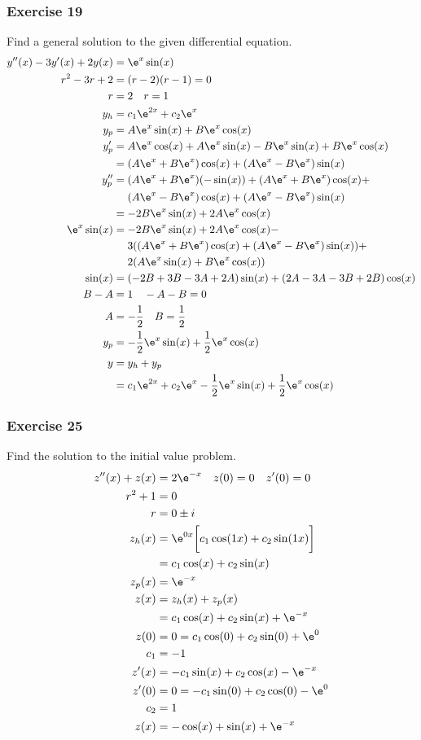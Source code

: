 \documentclass{math}
\begin{document}
\subsubsection*{Exercise 19}
Find a general solution to the given differential equation.
\begin{align*}
  y''(x)-3y'(x)+2y(x) &= \e^x\sin(x) \\
  r^2-3r+2 &= (r-2)(r-1) = 0 \\
  r &= 2 \quad r = 1 \\
  y_h &= c_1\e^{2x}+c_2\e^{x} \\
  y_p &= A\e^x\sin(x)+B\e^x\cos(x) \\
  y_p' &= A\e^x\cos(x)+A\e^x\sin(x)-B\e^x\sin(x)+B\e^x\cos(x) \\
  &= (A\e^x+B\e^x)\cos(x)+(A\e^x-B\e^x)\sin(x) \\
  y_p'' &= (A\e^x+B\e^x)(-\sin(x))+(A\e^x+B\e^x)\cos(x)+ \\
    &\quad~ (A\e^x-B\e^x)\cos(x)+(A\e^x-B\e^x)\sin(x) \\
  &= -2B\e^x\sin(x)+2A\e^x\cos(x) \\
  \e^x\sin(x) &= -2B\e^x\sin(x)+2A\e^x\cos(x)- \\
    &\quad~ 3((A\e^x+B\e^x)\cos(x)+(A\e^x-B\e^x)\sin(x))+ \\
    &\quad~ 2(A\e^x\sin(x)+B\e^x\cos(x)) \\
  \sin(x) &= (-2B+3B-3A+2A)\sin(x)+(2A-3A-3B+2B)\cos(x) \\
  B-A &= 1 \quad -A-B = 0 \\
  A &= -\frac{1}{2} \quad B = \frac{1}{2} \\
  y_p &= -\frac{1}{2}\e^x\sin(x)+\frac{1}{2}\e^x\cos(x) \\
  y &= y_h+y_p \\
  &= c_1\e^{2x}+c_2\e^{x}-\frac{1}{2}\e^x\sin(x)+\frac{1}{2}\e^x\cos(x)
\end{align*}

\subsubsection*{Exercise 25}
Find the solution to the initial value problem.
\begin{align*}
  z''(x)+z(x) &= 2\e^{-x} \quad z(0) = 0 \quad z'(0) = 0 \\
  r^2+1 &= 0 \\
  r &= 0\pm i \\
  z_h(x) &= \e^{0x}\bigg[c_1\cos(1x)+c_2\sin(1x)\bigg] \\
  &= c_1\cos(x)+c_2\sin(x) \\
  z_p(x) &= \e^{-x} \\
  z(x) &= z_h(x)+z_p(x) \\
  &= c_1\cos(x)+c_2\sin(x)+\e^{-x} \\
  z(0) &= 0 = c_1\cos(0)+c_2\sin(0)+\e^0 \\
  c_1 &= -1 \\
  z'(x) &= -c_1\sin(x)+c_2\cos(x)-\e^{-x} \\
  z'(0) &= 0 = -c_1\sin(0)+c_2\cos(0)-\e^0 \\
  c_2 &= 1 \\
  z(x) &= -\cos(x)+\sin(x)+\e^{-x}
\end{align*}
\end{document}
